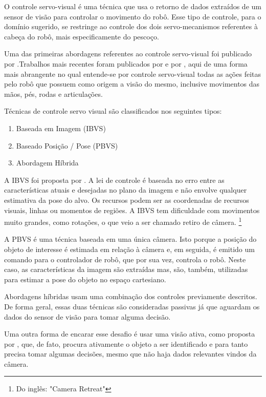 O controle servo-visual é uma técnica que usa o retorno de dados extraídos de um sensor de visão para controlar o movimento do robô. Esse tipo de controle, para o domínio sugerido, se restringe ao controle dos dois servo-mecanismos referentes à cabeça do robô, mais especificamente do pescoço.

Uma das primeiras abordagens referentes ao controle servo-visual foi publicado por .Trabalhos mais recentes foram publicados por  e por , aqui de uma forma mais abrangente no qual entende-se por controle servo-visual todas as ações feitas pelo robô que possuem como origem a visão do mesmo, inclusive movimentos das mãos, pés, rodas e articulações.

Técnicas de controle servo visual são classificados nos seguintes tipos:
\begin{enumerate}
     \item Baseada em Imagem (IBVS)
     \item Baseado Posição / Pose  (PBVS)
     \item Abordagem Híbrida
\end{enumerate}

A IBVS foi proposta por . A lei de controle é baseada no erro entre as características atuais e desejadas no plano da imagem e não envolve qualquer estimativa da pose do alvo. Os recursos podem ser as coordenadas de recursos visuais, linhas ou momentos de regiões. A IBVS tem dificuldade com movimentos muito grandes, como rotações, o que veio a ser chamado retiro de câmera. \footnote{Do inglês: "Camera Retreat"}

A PBVS é uma técnica baseada em uma única câmera. Isto porque a posição do objeto de interesse é estimada em relação à câmera e, em seguida, é emitido um comando para o controlador de robô, que por sua vez, controla o robô. Neste caso, as características da imagem são extraídas mas, são, também, utilizadas para estimar a pose do objeto no espaço cartesiano.

Abordagens híbridas usam uma combinação dos controles previamente descritos. De forma geral, essas duas técnicas são consideradas passivas já que aguardam os dados do sensor de visão para tomar alguma decisão. 

Uma outra forma de encarar esse desafio é usar uma visão ativa, como proposta por , que, de fato, procura ativamente o objeto a ser identificado e para tanto precisa tomar algumas decisões, mesmo que não haja dados relevantes vindos da câmera. 

